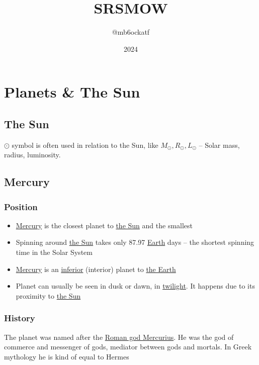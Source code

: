 
\title{SRSMOW}
\author{@mb6ockatf}
\date{2024}
\graphicspath{{./static/photos/}}

\maketitle
\tableofcontents
\section{Planets \& The Sun}
\subsection{The Sun}
$\odot$ symbol is often used in relation to the Sun, like $M_\odot, R_\odot,
L_\odot$ -- Solar mass, radius, luminosity.
\label{star:sun}

\subsection{Mercury}
\label{planet:mercury}
\subsubsection{Position}
\begin{itemize}
	\item \hyperref[planet:mercury]{Mercury} is the closest planet to
		\hyperref[star:sun]{the Sun} and the smallest
	\item Spinning around \hyperref[star:sun]{the Sun} takes only 87.97
		\hyperref[planet:earth]{Earth} days -- the shortest spinning
		time in the Solar System
	\item \hyperref[planet:mercury]{Mercury} is an
		\href{https://en.m.wikipedia.org/wiki/Inferior_and_superior_planets}{inferior}
		(interior) planet to \hyperref[planet:earth]{the Earth}
	\item Planet can usually be seen in dusk or dawn, in
		\href{https://en.wikipedia.org/wiki/Twilight}{twilight}. It
		happens due to its proximity to \hyperref[star:sun]{the Sun}
\end{itemize}
\subsubsection{History}
The planet was named after the
\href{https://en.wikipedia.org/wiki/Mercury_(mythology)}{Roman god Mercurius}.
He was the god of commerce and messenger of gods, mediator between gods and
mortals. In Greek mythology he is kind of equal to Hermes
